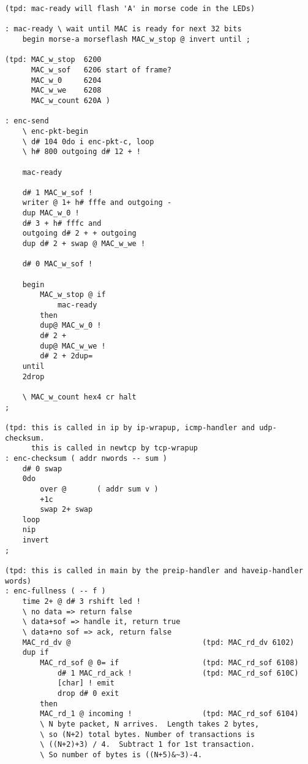 \begin{verbatim}
(tpd: mac-ready will flash 'A' in morse code in the LEDs)

: mac-ready \ wait until MAC is ready for next 32 bits
    begin morse-a morseflash MAC_w_stop @ invert until ;

(tpd: MAC_w_stop  6200 
      MAC_w_sof   6206 start of frame?
      MAC_w_0     6204 
      MAC_w_we    6208
      MAC_w_count 620A )

: enc-send
    \ enc-pkt-begin
    \ d# 104 0do i enc-pkt-c, loop
    \ h# 800 outgoing d# 12 + !

    mac-ready

    d# 1 MAC_w_sof !
    writer @ 1+ h# fffe and outgoing -
    dup MAC_w_0 !
    d# 3 + h# fffc and
    outgoing d# 2 + + outgoing
    dup d# 2 + swap @ MAC_w_we !

    d# 0 MAC_w_sof !

    begin
        MAC_w_stop @ if
            mac-ready
        then
        dup@ MAC_w_0 !
        d# 2 +
        dup@ MAC_w_we !
        d# 2 + 2dup=
    until
    2drop

    \ MAC_w_count hex4 cr halt
;

(tpd: this is called in ip by ip-wrapup, icmp-handler and udp-checksum.
      this is called in newtcp by tcp-wrapup
: enc-checksum ( addr nwords -- sum )
    d# 0 swap
    0do
        over @       ( addr sum v )
        +1c
        swap 2+ swap
    loop
    nip
    invert
;

(tpd: this is called in main by the preip-handler and haveip-handler words)
: enc-fullness ( -- f )
    time 2+ @ d# 3 rshift led !
    \ no data => return false
    \ data+sof => handle it, return true
    \ data+no sof => ack, return false
    MAC_rd_dv @                              (tpd: MAC_rd_dv 6102)
    dup if
        MAC_rd_sof @ 0= if                   (tpd: MAC_rd_sof 6108)
            d# 1 MAC_rd_ack !                (tpd: MAC_rd_sof 610C)
            [char] ! emit
            drop d# 0 exit
        then
        MAC_rd_1 @ incoming !                (tpd: MAC_rd_sof 6104)
        \ N byte packet, N arrives.  Length takes 2 bytes,
        \ so (N+2) total bytes. Number of transactions is
        \ ((N+2)+3) / 4.  Subtract 1 for 1st transaction.
        \ So number of bytes is ((N+5)&~3)-4.


\end{verbatim}
